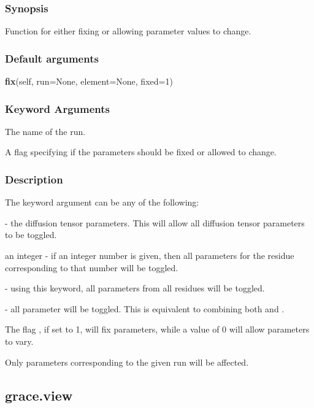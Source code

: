 \subsubsection{Synopsis}

Function for either fixing or allowing parameter values to change.

\subsubsection{Default arguments}

\textsf{\textbf{fix}(self, run=None, element=None, fixed=1)}


\subsubsection{Keyword Arguments}

  The name of the run.

  A flag specifying if the parameters should be fixed or allowed to change.

\subsubsection{Description}

The keyword argument 
 can be any of the following:

 - the diffusion tensor parameters.  This will allow all diffusion tensor parameters
to be toggled.

an integer - if an integer number is given, then all parameters for the residue
corresponding to that number will be toggled.

 - using this keyword, all parameters from all residues will be toggled.

 - all parameter will be toggled.  This is equivalent to combining both 
 and
.


The flag 
, if set to 1, will fix parameters, while a value of 0 will allow parameters
to vary.


Only parameters corresponding to the given run will be affected.


\newpage

\subsection{grace.view}



